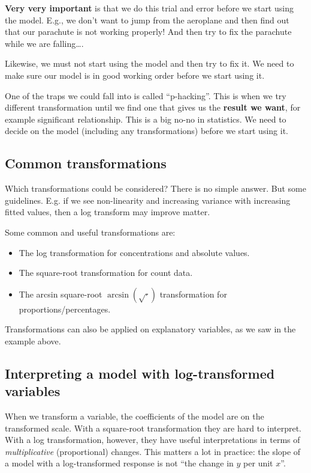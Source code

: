 \documentclass[
  letterpaper,
  8pt,
  a4paper]{book}
\providecommand{\tightlist}{%
  \setlength{\itemsep}{0pt}\setlength{\parskip}{0pt}}
\begin{document}
\textbf{Very very important} is that we do this trial and error before
we start using the model. E.g., we don't want to jump from the aeroplane
and then find out that our parachute is not working properly! And then
try to fix the parachute while we are falling\ldots.

Likewise, we must not start using the model and then try to fix it. We
need to make sure our model is in good working order before we start
using it.

One of the traps we could fall into is called ``p-hacking''. This is
when we try different transformation until we find one that gives us the
\textbf{result we want}, for example significant relationship. This is a
big no-no in statistics. We need to decide on the model (including any
transformations) before we start using it.

\subsection*{Common transformations}\label{common-transformations}

Which transformations could be considered? There is no simple answer.
But some guidelines. E.g. if we see non-linearity and increasing
variance with increasing fitted values, then a log transform may improve
matter.

Some common and useful transformations are:

\begin{itemize}
\tightlist
\item
  The log transformation for concentrations and absolute values.
\item
  The square-root transformation for count data.
\item
  The arcsin square-root \(\arcsin(\sqrt{\cdot})\) transformation for
  proportions/percentages.
\end{itemize}

Transformations can also be applied on explanatory variables, as we saw
in the example above.

\subsection*{Interpreting a model with log-transformed
variables}\label{interpreting-a-model-with-log-transformed-variables}

When we transform a variable, the coefficients of the model are on the
transformed scale. With a square-root transformation they are hard to
interpret. With a log transformation, however, they have useful
interpretations in terms of \emph{multiplicative} (proportional)
changes. This matters a lot in practice: the slope of a model with a
log-transformed response is not ``the change in \(y\) per unit \(x\)''.
\end{document}
